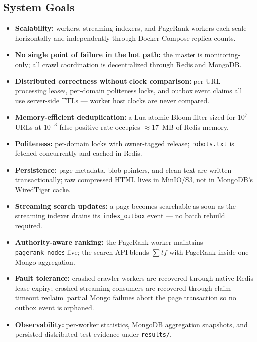 \documentclass[11pt,a4paper]{article}
\newcommand{\code}[1]{\texttt{#1}}
\begin{document}
\subsection{System Goals}

\begin{itemize}
  \item \textbf{Scalability:} workers, streaming indexers, and PageRank workers each scale horizontally and independently through Docker Compose replica counts.
  \item \textbf{No single point of failure in the hot path:} the master is monitoring-only; all crawl coordination is decentralized through Redis and MongoDB.
  \item \textbf{Distributed correctness without clock comparison:} per-URL processing leases, per-domain politeness locks, and outbox event claims all use server-side TTLs --- worker host clocks are never compared.
  \item \textbf{Memory-efficient deduplication:} a Lua-atomic Bloom filter sized for $10^7$ URLs at $10^{-3}$ false-positive rate occupies $\approx 17$~MB of Redis memory.
  \item \textbf{Politeness:} per-domain locks with owner-tagged release; \code{robots.txt} is fetched concurrently and cached in Redis.
  \item \textbf{Persistence:} page metadata, blob pointers, and clean text are written transactionally; raw compressed HTML lives in MinIO/S3, not in MongoDB's WiredTiger cache.
  \item \textbf{Streaming search updates:} a page becomes searchable as soon as the streaming indexer drains its \code{index\_outbox} event --- no batch rebuild required.
  \item \textbf{Authority-aware ranking:} the PageRank worker maintains \code{pagerank\_nodes} live; the search API blends \(\sum tf\) with PageRank inside one Mongo aggregation.
  \item \textbf{Fault tolerance:} crashed crawler workers are recovered through native Redis lease expiry; crashed streaming consumers are recovered through claim-timeout reclaim; partial Mongo failures abort the page transaction so no outbox event is orphaned.
  \item \textbf{Observability:} per-worker statistics, MongoDB aggregation snapshots, and persisted distributed-test evidence under \code{results/}.
\end{itemize}

\end{document}
